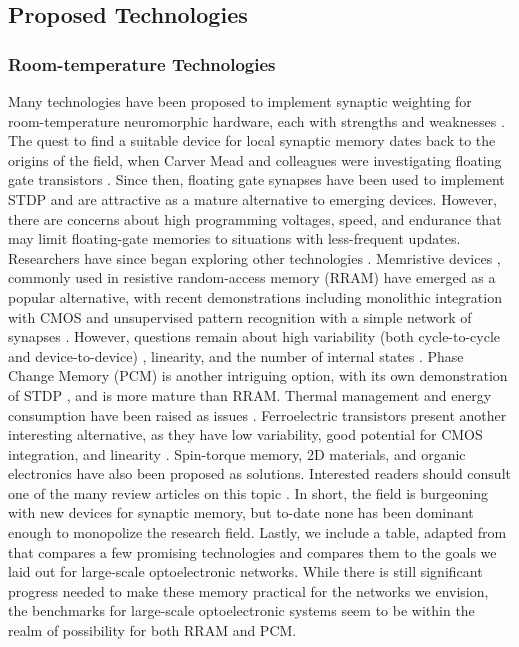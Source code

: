 \documentclass[twocolumn]{article}
\begin{document}
\subsection{Proposed Technologies}\label{Proposed}
\subsubsection{Room-temperature Technologies}

Many technologies have been proposed to implement synaptic weighting for room-temperature neuromorphic hardware, each with strengths and weaknesses \cite{upadhyay2019emerging}. The quest to find a suitable device for local synaptic memory dates back to the origins of the field, when Carver Mead and colleagues were investigating floating gate transistors \cite{diorio1998floating}. Since then, floating gate synapses have been used to implement STDP \cite{ramakrishnan2011floating} and are attractive as a mature alternative to emerging devices. However, there are concerns about high programming voltages, speed, and endurance that may limit floating-gate memories to situations with less-frequent updates. Researchers have since began exploring other technologies \cite{zahoor2020resistive}.  Memristive devices \cite{stsn2008,yast2012,ab2018}, commonly used in resistive random-access memory (RRAM) have emerged as a popular alternative, with recent demonstrations including monolithic integration with CMOS \cite{yin2019monolithically} and unsupervised pattern recognition with a simple network of synapses \cite{ielmini2018brain}. However, questions remain about high variability (both cycle-to-cycle and device-to-device) \cite{dalgaty2019hybrid}, linearity, and the number of internal states \cite{zahoor2020resistive}. Phase Change Memory (PCM) is another intriguing option, with its own demonstration of STDP \cite{ambrogio2016unsupervised}, and is more mature than RRAM. Thermal management and energy consumption have been raised as issues \cite{upadhyay2019emerging, zahoor2020resistive}. Ferroelectric transistors present another interesting alternative, as they have low variability, good potential for CMOS integration, and linearity \cite{kim2019ferroelectric}.  Spin-torque memory, 2D materials, and organic electronics have also been proposed as solutions. Interested readers should consult one of the many review articles on this topic \cite{kim2018recent, upadhyay2019emerging, zhang2020brain}. In short, the field is burgeoning with new devices for synaptic memory, but to-date none has been dominant enough to monopolize the research field. Lastly, we include a table, adapted from \cite{zahoor2020resistive} that compares a few promising technologies and compares them to the goals we laid out for large-scale optoelectronic networks. While there is still significant progress needed to make these memory practical for the networks we envision, the benchmarks for large-scale optoelectronic systems seem to be within the realm of possibility for both RRAM and PCM.
\end{document}
